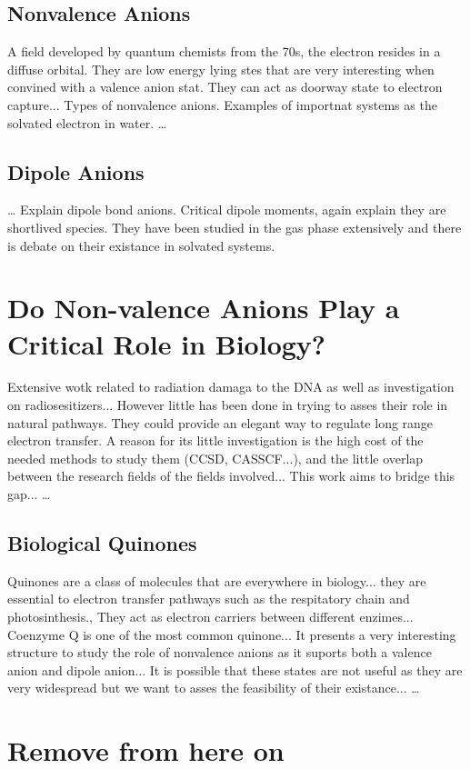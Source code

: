 \subsection{Nonvalence Anions}
A field developed by quantum chemists from the 70s, the electron resides in a diffuse orbital. They are low energy lying stes that are very interesting when convined with a valence anion stat. They can act as doorway state to electron capture... Types of nonvalence anions. Examples of importnat systems as the solvated electron in water.
\ldots
\subsection{Dipole Anions}
\ldots
Explain dipole bond anions. Critical dipole moments, again explain they are shortlived species. They have been studied in the gas phase extensively and there is debate on their existance in solvated systems.
\section{Do Non-valence Anions Play a Critical Role in Biology?}
Extensive wotk related to radiation damaga to the DNA as well as investigation on radiosesitizers... However little has been done in trying to asses their role in natural pathways. They could provide an elegant way to regulate long range electron transfer.
A reason for its little investigation is the high cost of the needed methods to study them (CCSD, CASSCF...), and the little overlap between the research fields of the fields involved... This work aims to bridge this gap... 
\ldots
\subsection{Biological Quinones}
Quinones are a class of molecules that are everywhere in biology... they are essential to electron transfer pathways such as the respitatory chain and photosinthesis., They act as electron carriers between different enzimes... Coenzyme Q is one of the most common quinone... It presents a very interesting structure to study the role of nonvalence anions as it suports both a valence anion and dipole anion... It is possible that these states are not useful as they are very widespread but we want to asses the feasibility of their existance... 
\ldots

\section{Remove from here on}

